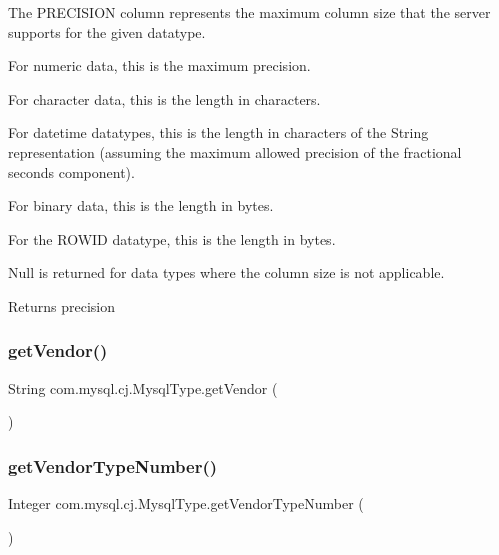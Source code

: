 The P\+R\+E\+C\+I\+S\+I\+ON column represents the maximum column size that the server supports for the given datatype. 
\begin{DoxyItemize}
\item For numeric data, this is the maximum precision. 
\item For character data, this is the length in characters. 
\item For datetime datatypes, this is the length in characters of the String representation (assuming the maximum allowed precision of the fractional seconds component). 
\item For binary data, this is the length in bytes. 
\item For the R\+O\+W\+ID datatype, this is the length in bytes. 
\item Null is returned for data types where the column size is not applicable. 
\end{DoxyItemize}

\begin{DoxyReturn}{Returns}
precision 
\end{DoxyReturn}
\mbox{\label{enumcom_1_1mysql_1_1cj_1_1_mysql_type_aaa1bf1c44644ef088c4808905764350e}} 
\subsubsection{\texorpdfstring{get\+Vendor()}{getVendor()}}
{\footnotesize\ttfamily String com.\+mysql.\+cj.\+Mysql\+Type.\+get\+Vendor (\begin{DoxyParamCaption}{ }\end{DoxyParamCaption})}

\mbox{\label{enumcom_1_1mysql_1_1cj_1_1_mysql_type_a71eb160870bf8c9e399f829a2274427d}} 
\subsubsection{\texorpdfstring{get\+Vendor\+Type\+Number()}{getVendorTypeNumber()}}
{\footnotesize\ttfamily Integer com.\+mysql.\+cj.\+Mysql\+Type.\+get\+Vendor\+Type\+Number (\begin{DoxyParamCaption}{ }\end{DoxyParamCaption})}

